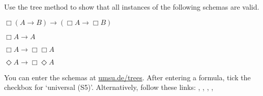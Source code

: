 \begin{exercise}
  Use the tree method to show that all instances of the following schemas are valid.
   \begin{exlist}
   \item[\pr{K}] $\Box (A \to B) \to (\Box A \to \Box B)$
   \item[\pr{T}] $\Box A \to A$
   \item[\pr{4}] $\Box A \to \Box \Box A$
   \item[\pr{5}] $\Diamond A \to \Box \Diamond A$
   \end{exlist}
\end{exercise}
\begin{solution}
  You can enter the schemas at
  \href{https://www.umsu.de/trees/}{umsu.de/trees}.
  After entering a formula, tick the checkbox for `universal (S5)'.
  Alternatively, follow these links:
  \href{https://www.umsu.de/trees/\#~8(A~5B)~5(~8A~5~8B)||universality}{}, \href{https://www.umsu.de/trees/\#~8A~5A||universality}{},
  \href{https://www.umsu.de/trees/\#~8A~5~8~8A||universality}{},
  \href{https://www.umsu.de/trees/\#~9A~5~8~9A||universality}{},
\end{solution}

